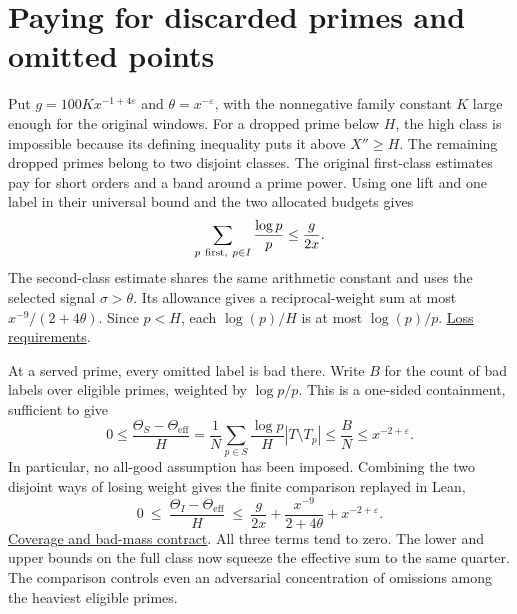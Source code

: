 \documentclass[12pt,letterpaper]{article}
\newcommand{\orig}[3]{\href{https://github.com/nousentllc/riemann-hypothesis/blob/40e56bab026552e089d7afcfeff08d2defb9c005/src/#1.lean\#L#2}{#3}}
\newcommand{\pagepart}[1]{\clearpage\section{#1}}
\newcommand{\eff}{\mathrm{eff}}
\begin{document}
\pagepart{Paying for discarded primes and omitted points}
Put \(g=100Kx^{-1+4\varepsilon}\) and \(\theta=x^{-\varepsilon}\), with the nonnegative family constant \(K\) large enough for the original windows. For a dropped prime below \(H\), the high class is impossible because its defining inequality puts it above \(X''\ge H\). The remaining dropped primes belong to two disjoint classes. The original first-class estimates pay for short orders and a band around a prime power. Using one lift and one label in their universal bound and the two allocated budgets gives
\[
 \sum_{p\ {\rm first},\ p\in I}\frac{\log p}{p}\le \frac{g}{2x}.
\]
The second-class estimate shares the same arithmetic constant and uses the selected signal \(\sigma>\theta\). Its allowance gives a reciprocal-weight sum at most \(x^{-9}/(2+4\theta)\). Since \(p<H\), each \(\log(p)/H\) is at most \(\log(p)/p\). \orig{Formalism/LocalToGlobal/GlobalTheory/LossRequirementsOfSmallShares}{86}{Loss requirements}.

At a served prime, every omitted label is bad there. Write \(B\) for the count of bad labels over eligible primes, weighted by \(\log p/p\). This is a one-sided containment, sufficient to give
\[
 0\le\frac{\Theta_S-\Theta_{\eff}}H
   =\frac1N\sum_{p\in S}\frac{\log p}{H}|T\setminus T_p|
   \le \frac{B}{N}\le x^{-2+\varepsilon}.
\]
In particular, no all-good assumption has been imposed. Combining the two disjoint ways of losing weight gives the finite comparison replayed in Lean,
\[
 0\ \le\ \frac{\Theta_I-\Theta_{\eff}}H
 \ \le\ \frac{g}{2x}+\frac{x^{-9}}{2+4\theta}+x^{-2+\varepsilon}.
\]
\orig{Formalism/SizeWindowBrackets/PrimeClassLossHypothesesSatisfiable}{86}{Coverage and bad-mass contract}.
All three terms tend to zero. The lower and upper bounds on the full class now squeeze the effective sum to the same quarter. The comparison controls even an adversarial concentration of omissions among the heaviest eligible primes.
\end{document}
